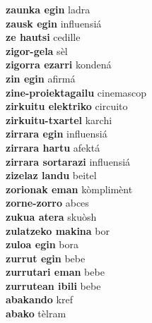 \textbf{ zaunka egin  } ladra \\
\textbf{ zausk egin  } influensiá \\
\textbf{ ze hautsi  } cedille \\
\textbf{ zigor-gela  } sèl \\
\textbf{ zigorra ezarri  } kondená \\
\textbf{ zin egin  } afirmá \\
\textbf{ zine-proiektagailu  } cinemascop \\
\textbf{ zirkuitu elektriko  } circuito \\
\textbf{ zirkuitu-txartel  } karchi \\
\textbf{ zirrara egin  } influensiá \\
\textbf{ zirrara hartu  } afektá \\
\textbf{ zirrara sortarazi  } influensiá \\
\textbf{ zizelaz landu  } beitel \\
\textbf{ zorionak eman  } kòmplimènt \\
\textbf{ zorne-zorro  } abces \\
\textbf{ zukua atera  } skuòsh \\
\textbf{ zulatzeko makina  } bor \\
\textbf{ zuloa egin  } bora \\
\textbf{ zurrut egin  } bebe \\
\textbf{ zurrutari eman  } bebe \\
\textbf{ zurrutean ibili  } bebe \\
\textbf{abakando } kref \\
\textbf{abako } tèlram \\
